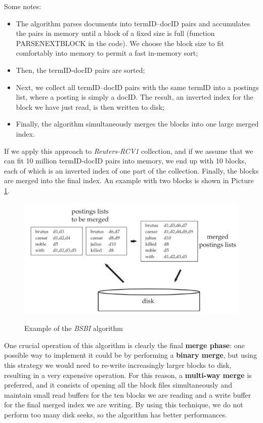 Some notes:

\begin{itemize}
    \item The algorithm parses documents into termID–docID pairs and accumulates the pairs in memory until a block of a fixed size is full (function PARSENEXTBLOCK in the code). We choose the block size to fit comfortably into memory to permit a fast in-memory sort;
    \item Then, the termID-docID pairs are sorted;
    \item Next, we collect all termID–docID pairs with the same termID into a postings list, where a posting is simply a docID. The result, an inverted index for the block we have just read, is then written to disk;
    \item Finally, the algorithm simultaneously merges the blocks into one large merged index.
\end{itemize}

If we apply this approach to \textit{Reuters-RCV1} collection, and if we assume that we can fit 10 million termID-docID pairs into memory, we end up with 10 blocks, each of which is an inverted index of one part of the collection. Finally, the blocks are merged into the final index. An example with two blocks is shown in Picture \ref{bsbi example}.

\begin{figure}[h!]
		\centering
		\includegraphics[scale = 1.5]{img/bsbi example.jpg}
		\label{bsbi example}
        \caption{Example of the \textit{BSBI} algorithm}
\end{figure}

One crucial operation of this algorithm is clearly the final \textbf{merge phase}: one possible way to implement it could be by performing a \textbf{binary merge}, but using this strategy we would need to re-write increasingly larger blocks to disk, resulting in a very expensive operation. For this reason, a \textbf{multi-way merge} is preferred, and it consists of opening all the block files simultaneously and maintain small read buffers for the ten blocks we are reading and a write buffer for the final merged index we are writing. By using this technique, we do not perform too many disk seeks, so the algorithm has better performances.

